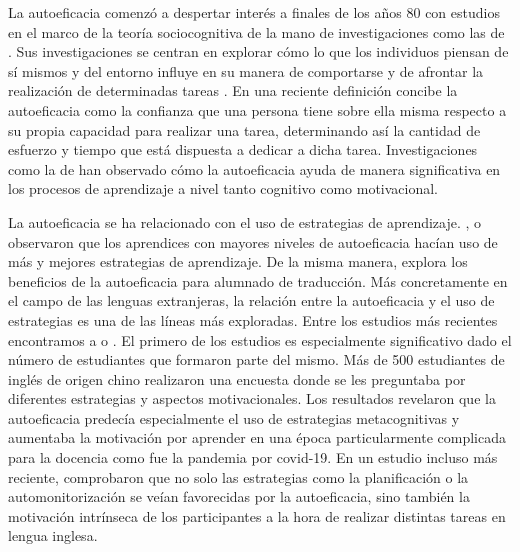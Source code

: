 La autoeficacia comenzó a despertar interés a finales de los años 80 con
estudios en el marco de la teoría sociocognitiva de la mano de
investigaciones como las de \textcite{bandura1986social}. Sus investigaciones se
centran en explorar cómo lo que los individuos piensan de sí mismos y
del entorno influye en su manera de comportarse y de afrontar la
realización de determinadas tareas \textcite{bandura1986social}. En una reciente
definición \textcite{lin2014learning} concibe la autoeficacia como la confianza que una
persona tiene sobre ella misma respecto a su propia capacidad para
realizar una tarea, determinando así la cantidad de esfuerzo y tiempo
que está dispuesta a dedicar a dicha tarea. Investigaciones como la de
\textcite{linnenbrink2003role} han observado cómo la autoeficacia ayuda
de manera significativa en los procesos de aprendizaje a nivel tanto
cognitivo como motivacional.

La autoeficacia se ha relacionado con el uso de estrategias de
aprendizaje. \textcite{li2010empirical}, \textcite{anam2016language} o \textcite{saito2020strategy}
observaron que los aprendices con mayores niveles de autoeficacia hacían
uso de más y mejores estrategias de aprendizaje. De la misma manera,
\textcite{haro2021soler2021} explora los beneficios de la autoeficacia para alumnado de
traducción. Más concretamente en el campo de las lenguas extranjeras, la
relación entre la autoeficacia y el uso de estrategias es una de las
líneas más exploradas. Entre los estudios más recientes encontramos a
\textcite{tengwangwu2021metacognitive} o \textcite{bai2023role}. El primero de los estudios
es especialmente significativo dado el número de estudiantes que
formaron parte del mismo. Más de 500 estudiantes de inglés de origen
chino realizaron una encuesta donde se les preguntaba por diferentes
estrategias y aspectos motivacionales. Los resultados revelaron que la
autoeficacia predecía especialmente el uso de estrategias metacognitivas
y aumentaba la motivación por aprender en una época particularmente
complicada para la docencia como fue la pandemia por covid-19. En un
estudio incluso más reciente, \textcite{bai2023role} comprobaron que no solo
las estrategias como la planificación o la automonitorización se veían
favorecidas por la autoeficacia, sino también la motivación intrínseca
de los participantes a la hora de realizar distintas tareas en lengua
inglesa.


